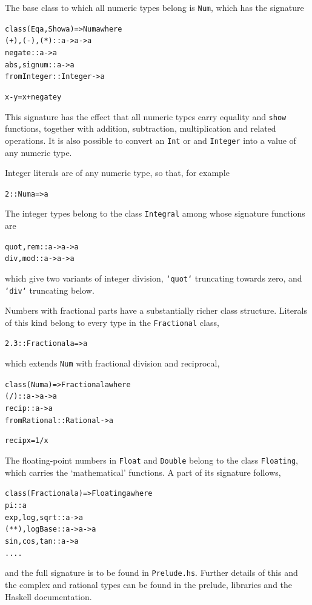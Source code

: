 The base class to which all numeric types belong is \texttt{Num}, which
has the signature\minx{-}
\begin{alltt}\minx{+}\minx{*}
class (Eq a, Show a) => Num a where
  (+), (-), (*)  :: a -> a -> a
  negate         :: a -> a
  abs, signum    :: a -> a
  fromInteger    :: Integer -> a

  x - y           = x + negate y
\end{alltt}
This signature has the effect that all numeric types carry 
equality and \texttt{show} functions, together
with addition, subtraction, multiplication and related operations. It is
also possible to convert an \texttt{Int} or and \texttt{Integer} into a
value of any numeric type.

Integer literals are of any numeric type, so that, for
example
\begin{alltt}
2 :: Num a => a
\end{alltt}
The integer types belong to the class \texttt{Integral}
among whose signature functions are
\begin{alltt}
quot, rem :: a -> a -> a
div, mod  :: a -> a -> a
\end{alltt}
which give two variants of integer division, \texttt{`quot`} truncating
towards zero, and \texttt{`div`} truncating below.

Numbers with fractional parts have a substantially richer class structure. 
Literals of this kind belong to every type in the \texttt{Fractional}
class,
\begin{alltt}
2.3 :: Fractional a => a 
\end{alltt}
which extends \texttt{Num} with fractional division and reciprocal,
\begin{alltt}\minx{/}
class (Num a) => Fractional a where
  (/)          :: a -> a -> a
  recip        :: a -> a
  fromRational :: Rational -> a

  recip x       = 1 / x
\end{alltt}
The floating-point numbers in \texttt{Float} and \texttt{Double} 
belong to the class
\texttt{Floating}, which carries the `mathematical' functions. A part of
its signature follows, 
\begin{alltt}
class (Fractional a) => Floating a where
  pi                  :: a
  exp, log, sqrt      :: a -> a
  (**), logBase       :: a -> a -> a\minx{**}
  sin, cos, tan       :: a -> a
   ....
\end{alltt}
and the full signature is to be found in \texttt{Prelude.hs}. Further
details of this and 
the complex and rational types can be found in the prelude, libraries and the
Haskell documentation.


